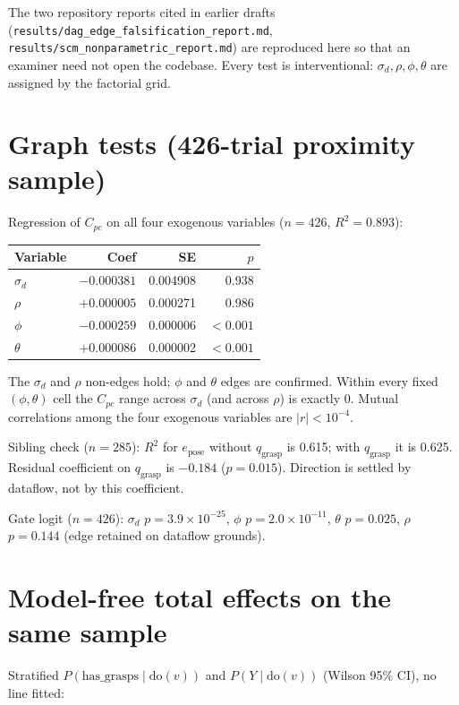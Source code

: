 \documentclass[11pt,a4paper]{report}
\begin{document}
The two repository reports cited in earlier drafts (\texttt{results/dag\_edge\_falsification\_report.md}, \texttt{results/scm\_nonparametric\_report.md}) are reproduced here so that an examiner need not open the codebase. Every test is interventional: $\sigma_d,\rho,\phi,\theta$ are assigned by the factorial grid.

\section{Graph tests (426-trial proximity sample)}

Regression of $C_{pc}$ on all four exogenous variables ($n=426$, $R^2=0.893$):

\begin{center}
\small
\begin{tabular}{lrrr}
  \toprule
  Variable & Coef & SE & $p$ \\
  \midrule
  $\sigma_d$ & $-0.000381$ & 0.004908 & 0.938 \\
  $\rho$     & $+0.000005$ & 0.000271 & 0.986 \\
  $\phi$     & $-0.000259$ & 0.000006 & $<0.001$ \\
  $\theta$   & $+0.000086$ & 0.000002 & $<0.001$ \\
  \bottomrule
\end{tabular}
\end{center}

The $\sigma_d$ and $\rho$ non-edges hold; $\phi$ and $\theta$ edges are confirmed. Within every fixed $(\phi,\theta)$ cell the $C_{pc}$ range across $\sigma_d$ (and across $\rho$) is exactly 0. Mutual correlations among the four exogenous variables are $|r|<10^{-4}$.

Sibling check ($n=285$): $R^2$ for $e_{\text{pose}}$ without $q_{\text{grasp}}$ is 0.615; with $q_{\text{grasp}}$ it is 0.625. Residual coefficient on $q_{\text{grasp}}$ is $-0.184$ ($p=0.015$). Direction is settled by dataflow, not by this coefficient.

Gate logit ($n=426$): $\sigma_d$ $p=3.9\times10^{-25}$, $\phi$ $p=2.0\times10^{-11}$, $\theta$ $p=0.025$, $\rho$ $p=0.144$ (edge retained on dataflow grounds).

\section{Model-free total effects on the same sample}

Stratified $P(\text{has\_grasps}\mid \mathrm{do}(v))$ and $P(Y\mid \mathrm{do}(v))$ (Wilson 95\% CI), no line fitted:
\end{document}
